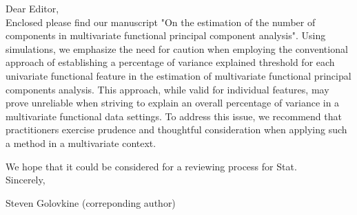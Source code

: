 \documentclass{article}
\date{\today}
\begin{document}
Dear Editor,
\\

Enclosed please find our manuscript "On the estimation of the number of components in multivariate functional principal component analysis". Using simulations, we emphasize the need for caution when employing the conventional approach of establishing a percentage of variance explained threshold for each univariate functional feature in the estimation of multivariate functional principal components analysis. This approach, while valid for individual features, may prove unreliable when striving to explain an overall percentage of variance in a multivariate functional data settings. To address this issue, we recommend that practitioners exercise prudence and thoughtful consideration when applying such a method in a multivariate context.


We hope that it could be considered for a reviewing process for Stat.
\\

Sincerely,

Steven Golovkine (correponding author)
\end{document}
